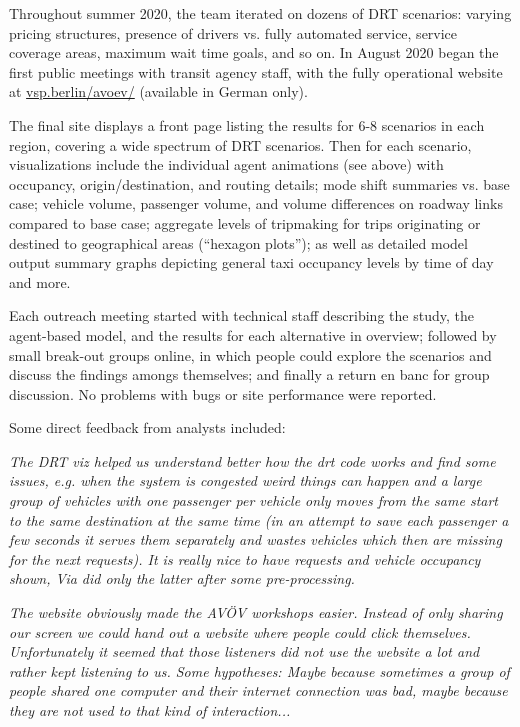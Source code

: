 Throughout summer 2020, the team iterated on dozens of DRT scenarios: varying pricing structures, presence of drivers vs. fully automated service, service coverage areas, maximum wait time goals, and so on. In August 2020 began the first public meetings with transit agency staff, with the fully operational website at \href{https://vsp.berlin/avoev}{vsp.berlin/avoev/} (available in German only).

The final site displays a front page listing the results for 6-8 scenarios in each region, covering a wide spectrum of DRT scenarios. Then for each scenario, visualizations include the individual agent animations (see above) with occupancy, origin/destination, and routing details; mode shift summaries vs. base case; vehicle volume, passenger volume, and volume differences on roadway links compared to base case; aggregate levels of tripmaking for trips originating or destined to geographical areas (``hexagon plots''); as well as detailed model output summary graphs depicting general taxi occupancy levels by time of day and more.

Each outreach meeting started with technical staff describing the study, the agent-based model, and the results for each alternative in overview; followed by small break-out groups online, in which people could explore the scenarios and discuss the findings amongs themselves; and finally a return en banc for group discussion. No problems with bugs or site performance were reported.

Some direct feedback from analysts included:

\small

\begin{displayquote}\emph{
  The DRT viz helped us understand better how the drt code works and find some issues, e.g. when the system is congested weird things can happen and a large group of vehicles with one passenger per vehicle only moves from the same start to the same destination at the same time (in an attempt to save each passenger a few seconds it serves them separately and wastes vehicles which then are missing for the next requests). It is really nice to have requests and vehicle occupancy shown, Via did only the latter after some pre-processing.
}\end{displayquote}

\begin{displayquote}\emph{
  The website obviously made the AVÖV workshops easier. Instead of only sharing our screen we could hand out a website where people could click themselves. Unfortunately it seemed that those listeners did not use the website a lot and rather kept listening to us. Some hypotheses: Maybe because sometimes a group of people shared one computer and their internet connection was bad, maybe because they are not used to that kind of interaction...
}\end{displayquote}

